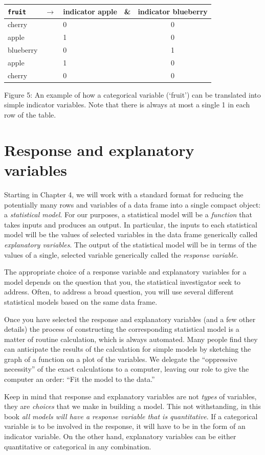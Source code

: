 \documentclass[]{tufte-book}
\begin{document}
\begin{longtable}[]{@{}lcllc@{}}
\toprule
\texttt{fruit} & \(\rightarrow\) & indicator apple & \& & indicator blueberry\tabularnewline
\midrule
\endhead
cherry & & 0 & & 0\tabularnewline
apple & & 1 & & 0\tabularnewline
blueberry & & 0 & & 1\tabularnewline
apple & & 1 & & 0\tabularnewline
cherry & & 0 & & 0\tabularnewline
\bottomrule
\end{longtable}

Figure 5: An example of how a categorical variable (`fruit') can be translated into simple indicator variables. Note that there is always at most a single 1 in each row of the table.

\hypertarget{response-and-explanatory-variables}{%
\section{Response and explanatory variables}\label{response-and-explanatory-variables}}

Starting in Chapter 4, we will work with a standard format for reducing the potentially many rows and variables of a data frame into a single compact object: a \emph{statistical model}. For our purposes, a statistical model will be a \emph{function} that takes inputs and produces an output. In particular, the inputs to each statistical model will be the values of selected variables in the data frame generically called \emph{explanatory variables}. The output of the statistical model will be in terms of the values of a single, selected variable generically called the \emph{response variable}.

The appropriate choice of a response variable and explanatory variables for a model depends on the question that you, the statistical investigator seek to address. Often, to address a broad question, you will use several different statistical models based on the same data frame.

Once you have selected the response and explanatory variables (and a few other details) the process of constructing the corresponding statistical model is a matter of routine calculation, which is always automated. Many people find they can anticipate the results of the calculation for simple models by sketching the graph of a function on a plot of the variables. We delegate the ``oppressive necessity'' of the exact calculations to a computer, leaving our role to give the computer an order: ``Fit the model to the data.''

Keep in mind that response and explanatory variables are not \emph{types} of variables, they are \emph{choices} that we make in building a model. This not withstanding, in this book \emph{all models will have a response variable that is quantitative}. If a categorical variable is to be involved in the response, it will have to be in the form of an indicator variable. On the other hand, explanatory variables can be either quantitative or categorical in any combination.
\end{document}
